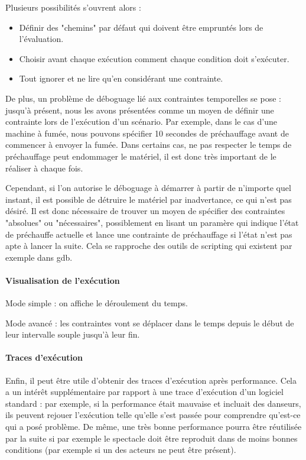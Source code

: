 \documentclass{sigchi}
\begin{document}
Plusieurs possibilités s'ouvrent alors :
\begin{itemize}
    \item Définir des "chemins" par défaut qui doivent être empruntés lors de l'évaluation.
    \item Choisir avant chaque exécution comment chaque condition doit s'exécuter.
    \item Tout ignorer et ne lire qu'en considérant une contrainte.
\end{itemize}

De plus, un problème de déboguage lié aux contraintes temporelles se pose : jusqu'à présent, nous les avons présentées comme un moyen de définir une contrainte lors de l'exécution d'un scénario. Par exemple, dans le cas d'une machine à fumée, nous pouvons spécifier 10 secondes de préchauffage avant de commencer à envoyer la fumée. Dans certains cas, ne pas respecter le temps de préchauffage peut endommager le matériel, il est donc très important de le réaliser à chaque fois.

Cependant, si l'on autorise le déboguage à démarrer à partir de n'importe quel instant, il est possible de détruire le matériel par inadvertance, ce qui n'est pas désiré. Il est donc nécessaire de trouver un moyen de spécifier des contraintes "absolues" ou "nécessaires", possiblement en lisant un paramère qui indique l'état de préchauffe actuelle et lance une contrainte de préchauffage si l'état n'est pas apte à lancer la suite. Cela se rapproche des outils de scripting qui existent par exemple dans gdb.

\paragraph{Visualisation de l'exécution}
Mode simple : on affiche le déroulement du temps.

Mode avancé : les contraintes vont se déplacer dans le temps depuis le début de leur intervalle souple jusqu'à leur fin.

\paragraph{Traces d'exécution}
Enfin, il peut être utile d'obtenir des traces d'exécution après performance. Cela a un intérêt supplémentaire par rapport à une trace d'exécution d'un logiciel standard : par exemple, si la performance était mauvaise et incluait des danseurs, ils peuvent rejouer l'exécution telle qu'elle s'est passée pour comprendre qu'est-ce qui a posé problème. De même, une très bonne performance pourra être réutilisée par la suite si par exemple le spectacle doit être reproduit dans de moins bonnes conditions (par exemple si un des acteurs ne peut être présent).
\end{document}
